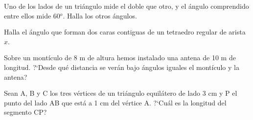 \begin{mipropuesto}
	
	Uno de los lados de un triángulo mide el doble que otro, y el ángulo comprendido entre ellos mide 60$^o$. Halla los otros ángulos.
\end{mipropuesto}

\vspace{-8mm}
\begin{flushright}
\begin{footnotesize} \textcolor{gris}{}	\end{footnotesize}
\end{flushright}

\begin{mipropuesto}
	
	Halla el ángulo que forman dos caras contiguas de un tetraedro regular de arista $x$.
\end{mipropuesto}

\vspace{-8mm}
\begin{flushright}
\begin{footnotesize} \textcolor{gris}{}	\end{footnotesize}
\end{flushright}

\begin{mipropuesto}
	
	Sobre un montículo de 8 m de altura hemos instalado una antena de 10 m de longitud. ?`Desde qué distancia se verán bajo ángulos iguales el montículo y la antena?
\end{mipropuesto}

\vspace{-8mm}
\begin{flushright}
\begin{footnotesize} \textcolor{gris}{}	\end{footnotesize}
\end{flushright}

\begin{mipropuesto}
	
	Sean A, B y C los tres vértices de un triángulo equilátero de lado 3 cm y P el punto del lado AB que está a 1 cm del vértice A. ?`Cuál es la longitud del segmento CP?
\end{mipropuesto}

